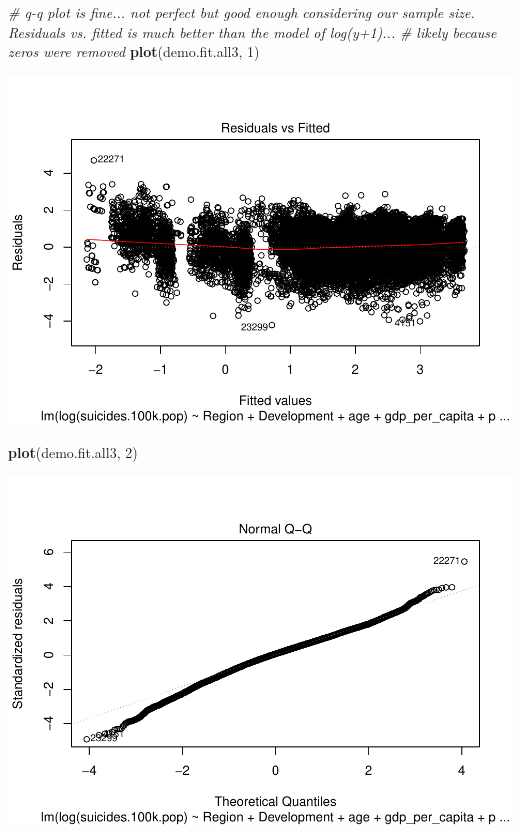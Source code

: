 \documentclass[11pt,]{article}
\newenvironment{Shaded}{\begin{snugshade}}{\end{snugshade}}
\newcommand{\CommentTok}[1]{\textcolor[rgb]{0.56,0.35,0.01}{\textit{#1}}}
\newcommand{\DecValTok}[1]{\textcolor[rgb]{0.00,0.00,0.81}{#1}}
\newcommand{\KeywordTok}[1]{\textcolor[rgb]{0.13,0.29,0.53}{\textbf{#1}}}
\newcommand{\NormalTok}[1]{#1}
\begin{document}
\begin{Shaded}
\begin{Highlighting}[]
\CommentTok{# q-q plot is fine... not perfect but good enough considering our sample size. Residuals vs. fitted is much better than the model of log(y+1)...}
\CommentTok{# likely because zeros were removed}
\KeywordTok{plot}\NormalTok{(demo.fit.all3, }\DecValTok{1}\NormalTok{)}
\end{Highlighting}
\end{Shaded}

\includegraphics{An-Analysis-of-Suicide-Data_files/figure-latex/unnamed-chunk-2-5.pdf}

\begin{Shaded}
\begin{Highlighting}[]
\KeywordTok{plot}\NormalTok{(demo.fit.all3, }\DecValTok{2}\NormalTok{)}
\end{Highlighting}
\end{Shaded}

\includegraphics{An-Analysis-of-Suicide-Data_files/figure-latex/unnamed-chunk-2-6.pdf}
\end{document}
